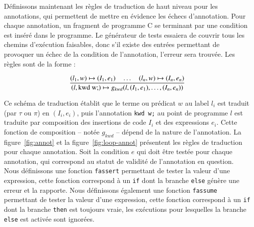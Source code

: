 Définissons maintenant les règles de traduction de haut niveau pour les
annotations, qui permettent de mettre en évidence les échecs d'annotation.
Pour chaque annotation, un fragment de programme C se terminant par une
condition est inséré dans le programme.
Le générateur de tests essaiera de couvrir tous les chemins d'exécution
faisables, donc s'il existe des entrées permettant de provoquer un échec de la
condition de l'annotation, l'erreur sera trouvée.
Les règles sont de la forme :


\[
\dfrac
    {(l_1, w) \rulearrow (I_1, e_1) \quad \ldots \quad
      (l_n, w) \rulearrow (I_n, e_n)}
    {(l, \mbox{\lstinline'kwd w;'}) \rulearrow
      g_{kwd} (l, (I_1, e_1), \ldots, (I_n, e_n))}
\]


Ce schéma de traduction établit que le terme ou prédicat $w$ au label $l_i$ est
traduit (par $\tau$ ou $\pi$) en $(I_i, e_i)$, puis l'annotation
\lstinline'kwd w;' au point de programme $l$ est traduite par composition
des insertions de code $I_i$ et des expressions $e_i$.
Cette fonction de composition -- notée $g_{kwd}$ -- dépend de la nature de
l'annotation.
La figure~\ref{fig:annot} et la figure~\ref{fig:loop-annot} présentent les
règles de traduction pour chaque annotation.
Soit la condition $e$ qui doit être testée pour chaque annotation, qui
correspond au statut de validité de l'annotation en question.
Nous définissons une fonction \lstinline'fassert' permettant de tester la valeur
d'une expression, cette fonction correspond à un \lstinline'if' dont la branche
\lstinline'else' génère une erreur et la rapporte.
Nous définissons également une fonction \lstinline'fassume' permettant de tester
la valeur d'une expression, cette fonction correspond à un \lstinline'if' dont
la branche \lstinline'then' est toujours vraie, les exécutions pour lesquelles
la branche \lstinline'else' est activée sont ignorées.

